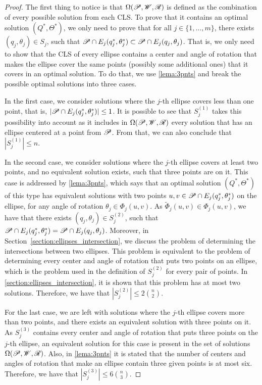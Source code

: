 \begin{proof}
	The first thing to notice is that $\Omega(\mathscr{P}, \mathscr{W}, \mathscr{R})$ is defined as the combination of every possible solution from each CLS. To prove that it contains an optimal solution $(Q^*, \Theta^*)$, we only need to prove that for all $j\in\{1, \dots, m\}$, there exists $(q_j, \theta_j)\in S_j$, such that $\mathscr{P} \cap E_j(q_j^*, \theta_j^*) \subset \mathscr{P} \cap E_j(q_j, \theta_j)$. That is, we only need to show that the CLS of every ellipse contains a center and angle of rotation that makes the ellipse cover the same points (possibly some additional ones) that it covers in an optimal solution. To do that, we use \autoref{lema:3pnts} and break the possible optimal solutions into three cases.
	
	 In the first case, we consider solutions where the $j$-th ellipse covers less than one point, that is, $|\mathscr{P} \cap E_j(q_j^*, \theta_j^*)|\le1$. It is possible to see that $S_j^{(1)}$ takes this possibility into account as it includes in $\Omega(\mathscr{P}, \mathscr{W}, \mathscr{R})$ every solution that has an ellipse centered at a point from $\mathscr{P}$. From that, we can also conclude that $|S_j^{(1)}| \le n$.
	
	In the second case, we consider solutions where the $j$-th ellipse covers at least two points, and no equivalent solution exists, such that three points are on it. This case is addressed by \autoref{lema:3pnts}, which says that an optimal solution $(Q^*, \Theta^*)$ of this type has equivalent solutions with two points $u, v \in \mathscr{P} \cap E_j(q_j^*, \theta_j^*)$ on the ellipse, for any angle of rotation $\theta_j \in \Phi_j(u, v)$.
	As $\tilde{\Phi}_j(u,v) \in \Phi_j(u,v)$, we have that there exists $(q_j, \theta_j) \in S_j^{(2)}$, such that $\mathscr{P} \cap E_j(q_j^*, \theta_j^*) = \mathscr{P} \cap E_j(q_j, \theta_j)$. 
	Moreover, in Section~\ref{section:ellipses_intersection}, we discuss the problem of determining the intersections between two ellipses. This problem is equivalent to the problem of determining every center and angle of rotation that puts two points on an ellipse, which is the problem used in the definition of $S_j^{(2)}$ for every pair of points. In \autoref{section:ellipses_intersection}, it is shown that this problem has at most two solutions. Therefore, we have that $|S_j^{(2)}| \le 2\binom{n}{2}$.
	
	For the last case, we are left with solutions where the $j$-th ellipse covers more than two points, and there exists an equivalent solution with three points on it. 
	As $S_j^{(3)}$ contains every center and angle of rotation that puts three points on the $j$-th ellipse, an equivalent solution for this case is present in the set of solutions $\Omega(\mathscr{P}, \mathscr{W}, \mathscr{R})$. Also, in \autoref{lema:3pnts} it is stated that the number of centers and angles of rotation that make an ellipse contain three given points is at most six. Therefore, we have that $|S_j^{(3)}| \le 6\binom{n}{3}$.


\end{proof}
